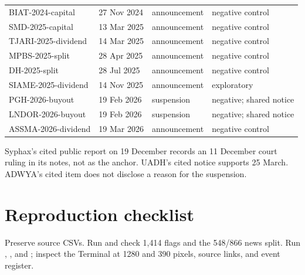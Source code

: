 \begin{tabular}{@{}p{43mm}p{23mm}p{32mm}p{44mm}@{}}
BIAT-2024-capital & 27 Nov 2024 & announcement & negative control\\
SMD-2025-capital & 13 Mar 2025 & announcement & negative control\\
TJARI-2025-dividend & 14 Mar 2025 & announcement & negative control\\
MPBS-2025-split & 28 Apr 2025 & announcement & negative control\\
DH-2025-split & 28 Jul 2025 & announcement & negative control\\
SIAME-2025-dividend & 14 Nov 2025 & announcement & exploratory\\
PGH-2026-buyout & 19 Feb 2026 & suspension & negative; shared notice\\
LNDOR-2026-buyout & 19 Feb 2026 & suspension & negative; shared notice\\
ASSMA-2026-dividend & 19 Mar 2026 & announcement & negative control\\
\bottomrule
\end{tabular}\par
\normalsize
Syphax's cited public report on 19 December records an 11 December
court ruling in its notes, not as the anchor. UADH's cited notice
supports 25 March. ADWYA's cited item does not disclose a reason for
the suspension.

\section{Reproduction checklist}
Preserve source CSVs. Run  and check
1,414 flags and the 548/866 news split. Run ,
, and ; inspect the
Terminal at 1280 and 390 pixels, source links, and event register.
